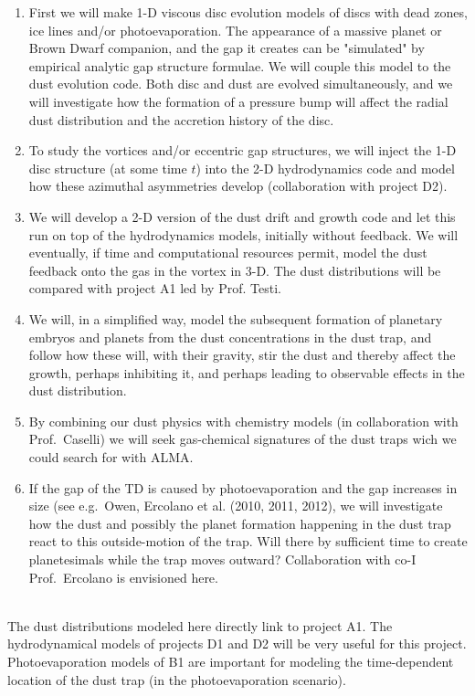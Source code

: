 \begin{enumerate}
\item First we will make 1-D viscous disc evolution models of discs with
  dead zones, ice lines and/or photoevaporation. The appearance of a massive
  planet or Brown Dwarf companion, and the gap it creates can be "simulated"
  by empirical analytic gap structure formulae. We will couple this model to
  the dust evolution code. Both disc and dust are evolved simultaneously,
  and we will investigate how the formation of a pressure bump will affect
  the radial dust distribution and the accretion history of the disc.
\item To study the vortices and/or eccentric gap structures, we will inject
  the 1-D disc structure (at some time $t$) into the 2-D hydrodynamics code
  and model how these azimuthal asymmetries develop (collaboration with
  project D2).
\item We will develop a 2-D version of the dust drift and growth code and
  let this run on top of the hydrodynamics models, initially without
  feedback. We will eventually, if time and computational resources permit,
  model the dust feedback onto the gas in the vortex in 3-D. The dust 
  distributions will be compared with project A1 led by Prof. Testi.
\item We will, in a simplified way, model the subsequent formation of
  planetary embryos and planets from the dust concentrations in the dust
  trap, and follow how these will, with their gravity, stir the dust and
  thereby affect the growth, perhaps inhibiting it, and perhaps leading to
  observable effects in the dust distribution.
\item By combining our dust physics with chemistry models (in collaboration
  with Prof.~Caselli) we will seek gas-chemical signatures of
  the dust traps wich we could search for with ALMA.
\item If the gap of the TD is caused by photoevaporation and
  the gap increases in size (see e.g.~Owen, Ercolano et al. (2010, 2011, 2012), we will
  investigate how the dust and possibly the planet formation happening in
  the dust trap react to this outside-motion of the trap. Will there by
  sufficient time to create planetesimals while the trap moves outward?
  Collaboration with co-I Prof.~Ercolano is envisioned here.
\end{enumerate}


\vspace{0.2em}
\\
The dust distributions modeled here directly link to project A1.  The
hydrodynamical models of projects D1 and D2 will be very useful
for this project. Photoevaporation models of B1 are important for 
modeling the time-dependent location of the dust trap (in the photoevaporation
scenario).


